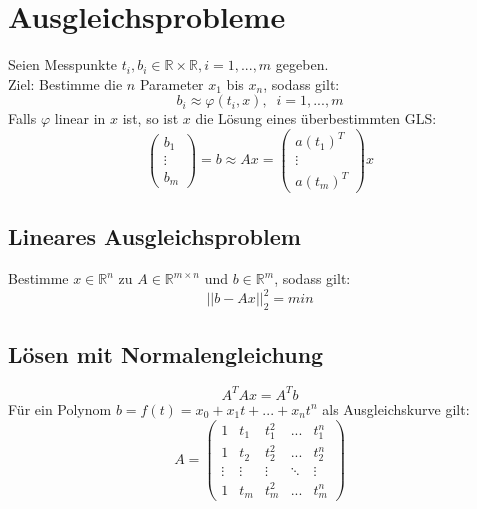 \documentclass[a4paper,twocolumn,10pt]{article}
\begin{document}
\section{Ausgleichsprobleme}
Seien Messpunkte $t_i,b_i\in\mathbb{R}\times\mathbb{R},i=1,...,m$ gegeben.\\
Ziel: Bestimme die $n$ Parameter $x_1$ bis $x_n$, sodass gilt:
\begin{equation*}
b_i\approx\varphi(t_i,x),\;\;i=1,...,m
\end{equation*}
Falls $\varphi$ linear in $x$ ist, so ist $x$ die Lösung eines überbestimmten GLS:
\begin{equation*}
\begin{pmatrix}b_1 \\ \vdots \\ b_m\end{pmatrix}=b\approx Ax=\begin{pmatrix}a(t_1)^T \\ \vdots \\ a(t_m)^T\end{pmatrix}x
\end{equation*}

\subsection{Lineares Ausgleichsproblem}
Bestimme $x\in\mathbb{R}^n$ zu $A\in\mathbb{R}^{m\times n}$ und $b\in\mathbb{R}^m$, sodass gilt:
\begin{equation*}
||b-Ax||_2^2=min
\end{equation*}

\subsection{Lösen mit Normalengleichung}
\begin{equation*}
A^TAx=A^Tb
\end{equation*}
Für ein Polynom $b=f(t)=x_0+x_1t+...+x_nt^n$ als Ausgleichskurve gilt:
\begin{equation*}
A=\begin{pmatrix}1 & t_1 & t_1^2 & ... & t_1^n \\ 1 & t_2 & t_2^2 & ... & t_2^n \\ \vdots & \vdots & \vdots & \ddots & \vdots \\ 1 & t_m & t_m^2 & ... & t_m^n\end{pmatrix}
\end{equation*}
\end{document}

